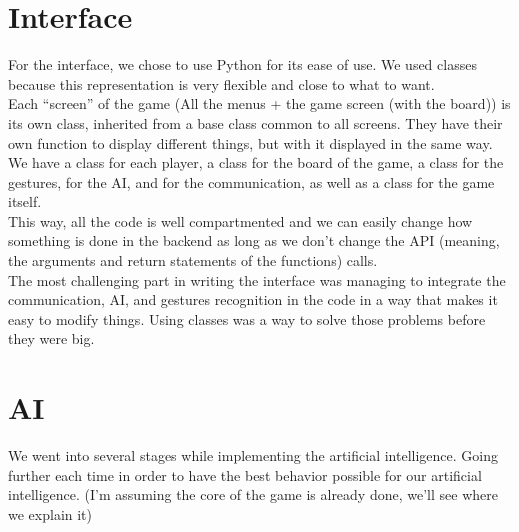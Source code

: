\documentclass[12pt, a4paper, oneside]{report}
\begin{document}
	\section{Interface}
	For the interface, we chose to use Python for its ease of use. We used classes because this representation is very flexible and close to what to want. \\

	Each “screen” of the game (All the menus + the game screen (with the board)) is its own class, inherited from a base class common to all screens. They have their own function to display different things, but with it displayed in the same way. \\ %

	We have a class for each player, a class for the board of the game, a class for the gestures, for the AI, and for the communication, as well as a class for the game itself. \\
	This way, all the code is well compartmented and we can easily change how something is done in the backend as long as we don't change the API (meaning, the arguments and return statements of the functions) calls. \\

	The most challenging part in writing the interface was managing to integrate the communication, AI, and gestures recognition in the code in a way that makes it easy to modify things. Using classes was a way to solve those problems before they were big.

	\section{AI}\label{AI_section}

	We went into several stages while implementing the artificial intelligence. Going further each time in order to have the best behavior possible for our artificial intelligence. (I’m assuming the core of the game is already done, we’ll see where we explain it)
\end{document}
